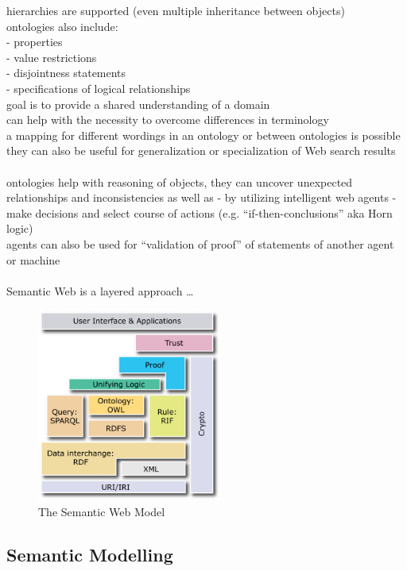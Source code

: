 hierarchies are supported (even multiple inheritance between objects) \\
ontologies also include: \\
- properties \\
- value restrictions \\
- disjointness statements \\
- specifications of logical relationships \\
goal is to provide a shared understanding of a domain \\
can help with the necessity to overcome differences in terminology \\
a mapping for different wordings in an ontology or between ontologies is possible \\
they can also be useful for generalization or specialization of Web search results \\
\\
ontologies help with reasoning of objects, they can uncover unexpected relationships and
inconsistencies as well as - by utilizing intelligent web agents - make decisions and select course of actions
(e.g. ``if-then-conclusions'' aka Horn logic) \\
agents can also be used for ``validation of proof'' of statements of another agent or machine \\
\\
Semantic Web is a layered approach \ldots

\begin{figure}[H]
	\centering
		\includegraphics[height=2.5in]{images/semantic_web_layers.png}
	\caption[The Semantic Web Model]{The Semantic Web Model \citep{W3C2013}}
\label{fig:images_semweb_model}
\end{figure}


\subsection{Semantic Modelling}
\label{sec:semantic_models}

